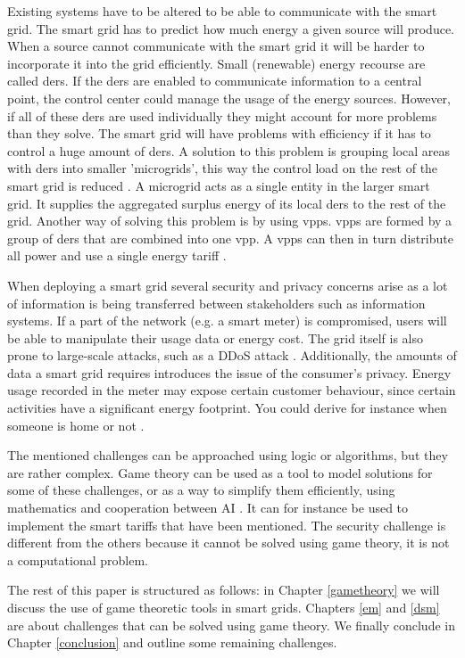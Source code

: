 Existing systems have to be altered to be able to communicate with the smart grid.  The smart grid has to predict how much energy a given source will produce. When a source cannot communicate with the smart grid it will be harder to incorporate it into the grid efficiently. Small (renewable) energy recourse are called \acp{der}. If the \acp{der} are enabled to communicate information to a central point, the control center could manage the usage of the energy sources. However, if all of these \acp{der} are used individually they might account for more problems than they solve. The smart grid will have problems with efficiency if it has to control a huge amount of \acp{der}. A solution to this problem is grouping local areas with \acp{der} into smaller 'microgrids', this way the control load on the rest of the smart grid is reduced \cite{HatziargyriouAsanoIravaniMarnay2007}. A microgrid acts as a single entity in the larger smart grid. It supplies the aggregated surplus energy of its local \acp{der} to the rest of the grid. Another way of solving this problem is by using \acp{vpp}. \acp{vpp} are formed by a group of \acp{der} that are combined into one \ac{vpp}. A \acp{vpp} can then in turn distribute all power and use a single energy tariff \cite{NikonowiczMilewski2012}.

When deploying a smart grid several security and privacy concerns arise as a lot of information is being transferred between stakeholders such as information systems. If a part of the network (e.g. a smart meter) is compromised, users will be able to manipulate their usage data or energy cost. The grid itself is also prone to large-scale attacks, such as a DDoS attack \cite{McDanielMcLaughlin2009a}. Additionally, the amounts of data a smart grid requires introduces the issue of the consumer's privacy. Energy usage recorded in the meter may expose certain customer behaviour, since certain activities have a significant energy footprint. You could derive for instance when someone is home or not \cite{Molina-MarkhamShenoyFuEtAl2010}. 

The mentioned challenges can be approached using logic or algorithms, but they are rather complex. Game theory can be used as a tool to model solutions for some of these challenges, or as a way to simplify them efficiently, using mathematics and cooperation between AI \cite{myerson2013game}. It can for instance be used to implement the smart tariffs that have been mentioned. The security challenge is different from the others because it cannot be solved using game theory, it is not a computational problem.

The rest of this paper is structured as follows: in Chapter \ref{gametheory} we will discuss the use of game theoretic tools in smart grids. Chapters \ref{em} and \ref{dsm} are about challenges that can be solved using game theory. We finally conclude in Chapter \ref{conclusion} and outline some remaining challenges.